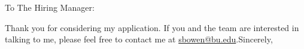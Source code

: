\documentclass[11pt,a4paper,sans]{moderncv}        %
\begin{document}
\clearpage
\date{\today}

\opening{To The Hiring Manager:}
\closing{Thank you for considering my application. If you and the team are interested in talking to me, please feel free to contact me at \underline{sbowen@bu.edu}.\newline\newline Sincerely,}
\makelettertitle


\makeletterclosing

\end{document}
